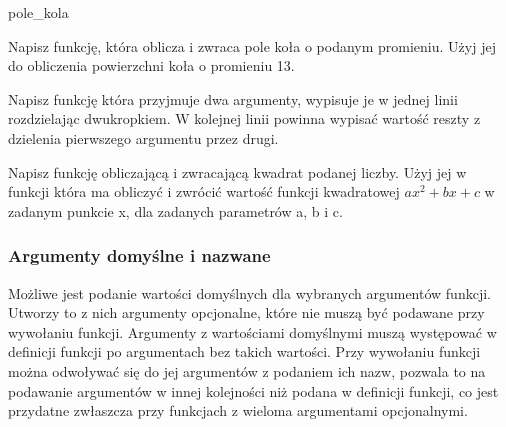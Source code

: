 \documentclass{pdfBooklets}
\begin{document}
\begin{Zadanie}{}{pole_kola}

Napisz funkcję, która oblicza i zwraca pole koła o podanym promieniu. Użyj jej do obliczenia powierzchni koła o promieniu 13.

\end{Zadanie}

\begin{Zadanie}{}{}

Napisz funkcję która przyjmuje dwa argumenty, wypisuje je w jednej linii rozdzielając dwukropkiem.
W kolejnej linii powinna wypisać wartość reszty z dzielenia pierwszego argumentu przez drugi.
\end{Zadanie}

\begin{Zadanie}{}{}

Napisz funkcję obliczającą i zwracającą kwadrat podanej liczby. Użyj jej w funkcji która ma obliczyć
i zwrócić wartość funkcji kwadratowej $ax^2 + bx + c$ w zadanym punkcie x, dla zadanych parametrów a, b i c.

\end{Zadanie}


\subsubsection{Argumenty domyślne i nazwane {\Symbola 🤔}}

Możliwe jest podanie wartości domyślnych dla wybranych argumentów funkcji. Utworzy to z nich argumenty opcjonalne, które nie muszą być podawane przy wywołaniu funkcji.
Argumenty z wartościami domyślnymi muszą występować w definicji funkcji po argumentach bez takich wartości.
Przy wywołaniu funkcji można odwoływać się do jej argumentów z podaniem ich nazw, pozwala to na podawanie argumentów w innej kolejności niż podana w definicji funkcji,
co jest przydatne zwłaszcza przy funkcjach z wieloma argumentami opcjonalnymi.
\end{document}
